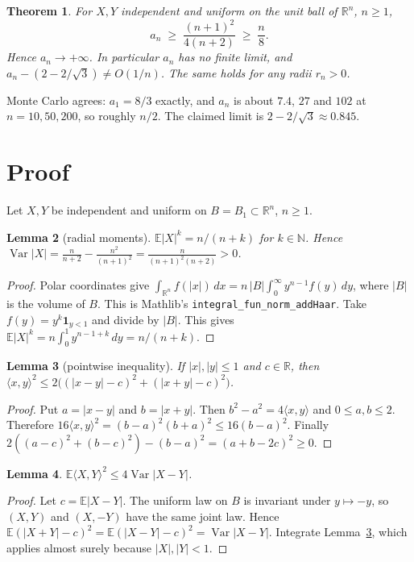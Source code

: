 \documentclass[11pt]{article}
\newtheorem{theorem}{Theorem}
\newtheorem{lemma}[theorem]{Lemma}
\newcommand{\E}{\mathbb{E}}
\newcommand{\Var}{\operatorname{Var}}
\newcommand{\R}{\mathbb{R}}
\begin{document}
\begin{theorem}\label{thm:main}
For $X, Y$ independent and uniform on the unit ball of $\R^n$, $n \ge 1$,
\[ a_n \;\ge\; \frac{(n+1)^2}{4(n+2)} \;\ge\; \frac n8 . \]
Hence $a_n \to +\infty$. In particular $a_n$ has no finite limit, and $a_n - (2 - 2/\sqrt 3) \ne O(1/n)$.
The same holds for any radii $r_n > 0$.
\end{theorem}

Monte Carlo agrees: $a_1 = 8/3$ exactly, and $a_n$ is about $7.4$, $27$ and $102$ at $n = 10, 50, 200$, so
roughly $n/2$. The claimed limit is $2 - 2/\sqrt3 \approx 0.845$.

\section{Proof}

Let $X, Y$ be independent and uniform on $B = B_1 \subset \R^n$, $n \ge 1$.

\begin{lemma}[radial moments]\label{lem:mom}
$\E|X|^k = n/(n+k)$ for $k \in \mathbb N$. Hence $\Var|X| = \frac{n}{n+2} - \frac{n^2}{(n+1)^2}
= \frac{n}{(n+1)^2(n+2)} > 0$.
\end{lemma}
\begin{proof}
Polar coordinates give $\int_{\R^n} f(|x|)\,dx = n\,|B| \int_0^\infty y^{n-1} f(y)\,dy$, where $|B|$ is the
volume of $B$. This is Mathlib's \texttt{integral\_fun\_norm\_addHaar}. Take
$f(y) = y^k \mathbf 1_{y<1}$ and divide by $|B|$. This gives
$\E|X|^k = n\int_0^1 y^{n-1+k}\,dy = n/(n+k)$.
\end{proof}

\begin{lemma}[pointwise inequality]\label{lem:pt}
If $|x|, |y| \le 1$ and $c \in \R$, then $\langle x,y\rangle^2 \le 2\big((|x-y|-c)^2 + (|x+y|-c)^2\big)$.
\end{lemma}
\begin{proof}
Put $a = |x-y|$ and $b = |x+y|$. Then $b^2 - a^2 = 4\langle x,y\rangle$ and $0 \le a, b \le 2$. Therefore
$16\langle x,y\rangle^2 = (b-a)^2(b+a)^2 \le 16(b-a)^2$. Finally
$2((a-c)^2+(b-c)^2) - (b-a)^2 = (a+b-2c)^2 \ge 0$.
\end{proof}

\begin{lemma}\label{lem:var}
$\E\langle X, Y\rangle^2 \le 4 \Var|X-Y|$.
\end{lemma}
\begin{proof}
Let $c = \E|X-Y|$. The uniform law on $B$ is invariant under $y \mapsto -y$, so $(X,Y)$ and $(X,-Y)$ have the
same joint law. Hence $\E(|X+Y|-c)^2 = \E(|X-Y|-c)^2 = \Var|X-Y|$. Integrate Lemma~\ref{lem:pt},
which applies almost surely because $|X|, |Y| < 1$.
\end{proof}
\end{document}
